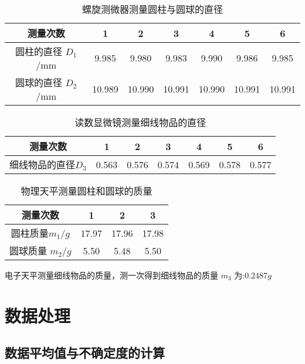 \documentclass[UTF8]{ctexart}
\begin{document}
\begin{table}[H]
\centering
\caption{螺旋测微器测量圆柱与圆球的直径}
\begin{tabular}{|c|c|c|c|c|c|c|}
\hline
     测量次数 & 1 & 2 & 3 & 4 & 5 & 6 \\
\hline
     圆柱的直径 $D_1$/mm & 9.985 & 9.980 & 9.983 & 9.990 & 9.986 & 9.985 \\ 
\hline
     圆球的直径 $D_2$/mm & 10.989 & 10.990 & 10.991 &  10.990 & 10.991 & 10.991\\ 
\hline
\end{tabular}
\end{table}

\begin{table}[H]
\centering
\caption{读数显微镜测量细线物品的直径}
\begin{tabular}{|c|c|c|c|c|c|c|}
\hline
     测量次数 & 1 & 2 & 3 & 4 & 5 & 6 \\
\hline
    细线物品的直径$D_3$ & 0.563 & 0.576 & 0.574 & 0.569 & 0.578 & 0.577 \\
\hline
\end{tabular}
\end{table}

\begin{table}[H]
\centering
\caption{物理天平测量圆柱和圆球的质量}
\begin{tabular}{|c|c|c|c|}
\hline
     测量次数 & 1 & 2 & 3  \\
\hline
     圆柱质量$m_1/g$ & 17.97 & 17.96 & 17.98 \\ 
\hline
     圆球质量 $m_2/g$ & 5.50 & 5.48 & 5.50\\ 
\hline
\end{tabular}
\end{table}
电子天平测量细线物品的质量，测一次得到细线物品的质量 $m_3$ 为:$0.2487g$

\section{数据处理}
\subsection{数据平均值与不确定度的计算}
\end{document}
